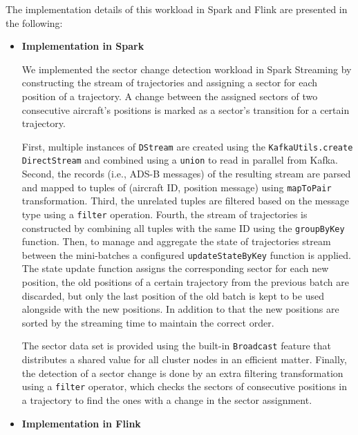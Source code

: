 \documentclass[]{article}
\begin{document}
 The implementation details of this workload in Spark and Flink are presented in the following: 
 
 \begin{itemize}
 \item {\bf{Implementation in Spark }}
 
 We implemented the sector change detection workload in Spark Streaming by constructing the stream of trajectories and assigning a sector for each position of a trajectory. A change between the assigned sectors of two consecutive aircraft's positions is marked  as a sector's transition for a certain trajectory. \par First, multiple instances of \texttt{DStream} are created using the \texttt{KafkaUtils.create} \texttt{DirectStream} and combined using a \texttt{union} to read in  parallel from Kafka. Second, the records (i.e., ADS-B messages) of the resulting stream are parsed and mapped to tuples of (aircraft ID, position message) using \texttt{mapToPair} transformation. Third, the unrelated  tuples are filtered based on the message type using a \texttt{filter} operation. Fourth, the stream of trajectories is constructed by combining all tuples with the same ID using the \texttt{groupByKey} function. Then, to manage and aggregate the state of trajectories stream between the mini-batches a configured \texttt{updateStateByKey} function is applied. The state update function assigns the corresponding sector for each new position, the old positions of a certain trajectory from the previous batch are discarded, but only the last position of the old batch is kept to be used alongside with the new positions. In addition to that the new positions are sorted by the streaming time to maintain the correct order.
 \par The sector data set is provided using the built-in \texttt{Broadcast} feature that distributes a shared value for  all cluster nodes in an efficient matter. Finally, the detection of a sector change is done by an extra filtering transformation using a \texttt{filter} operator, which checks the sectors of consecutive positions in a trajectory to find the ones with a change in the sector assignment.

 
  
 \item {\bf{Implementation in Flink }}
 

\end{itemize}
\end{document}
